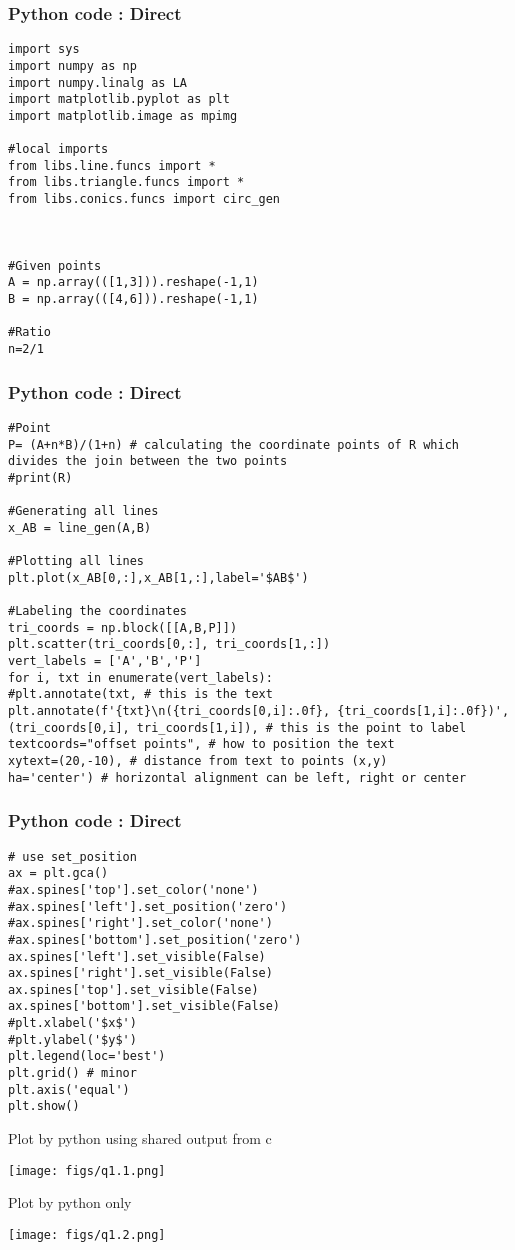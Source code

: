 \documentclass{beamer}
\begin{document}
	\begin{frame}[fragile]
	\frametitle{Python code : Direct }
	
	\begin{lstlisting}
import sys                                                 
import numpy as np
import numpy.linalg as LA
import matplotlib.pyplot as plt
import matplotlib.image as mpimg

#local imports
from libs.line.funcs import *
from libs.triangle.funcs import *
from libs.conics.funcs import circ_gen



#Given points
A = np.array(([1,3])).reshape(-1,1)
B = np.array(([4,6])).reshape(-1,1)

#Ratio
n=2/1
	\end{lstlisting}
\end{frame}
	\begin{frame}[fragile]
	\frametitle{Python code : Direct }
	
	\begin{lstlisting}
#Point
P= (A+n*B)/(1+n) # calculating the coordinate points of R which divides the join between the two points
#print(R)

#Generating all lines
x_AB = line_gen(A,B)

#Plotting all lines
plt.plot(x_AB[0,:],x_AB[1,:],label='$AB$')

#Labeling the coordinates
tri_coords = np.block([[A,B,P]])
plt.scatter(tri_coords[0,:], tri_coords[1,:])
vert_labels = ['A','B','P']
for i, txt in enumerate(vert_labels):
#plt.annotate(txt, # this is the text
plt.annotate(f'{txt}\n({tri_coords[0,i]:.0f}, {tri_coords[1,i]:.0f})',
(tri_coords[0,i], tri_coords[1,i]), # this is the point to label
textcoords="offset points", # how to position the text
xytext=(20,-10), # distance from text to points (x,y)
ha='center') # horizontal alignment can be left, right or center
	\end{lstlisting}
\end{frame}
	\begin{frame}[fragile]
	\frametitle{Python code : Direct }
	
	\begin{lstlisting}
# use set_position
ax = plt.gca()
#ax.spines['top'].set_color('none')
#ax.spines['left'].set_position('zero')
#ax.spines['right'].set_color('none')
#ax.spines['bottom'].set_position('zero')
ax.spines['left'].set_visible(False)
ax.spines['right'].set_visible(False)
ax.spines['top'].set_visible(False)
ax.spines['bottom'].set_visible(False)
#plt.xlabel('$x$')
#plt.ylabel('$y$')
plt.legend(loc='best')
plt.grid() # minor
plt.axis('equal')
plt.show()
	\end{lstlisting}
\end{frame}


\begin{frame}{Plot by python using shared output from c}
	\begin{center}
		\texttt{[image: figs/q1.1.png]}
	\end{center}
\end{frame}

\begin{frame}{Plot by python only}
	\begin{center}
		\texttt{[image: figs/q1.2.png]}
	\end{center}
\end{frame}
\end{document}
